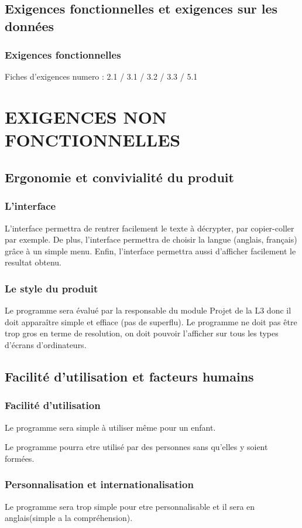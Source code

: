 \documentclass[a4]{article}
\begin{document}
		\subsection{Exigences fonctionnelles et exigences sur les données}
			\subsubsection {Exigences fonctionnelles}
				Fiches d'exigences numero : 2.1 / 3.1 / 3.2 / 3.3 / 5.1
	\section{EXIGENCES NON FONCTIONNELLES}
		\subsection{Ergonomie et convivialité du produit}
			\subsubsection {L'interface}
				L'interface permettra de rentrer facilement le texte à décrypter, par copier-coller par exemple.
				De plus, l'interface permettra de choisir la langue (anglais, français) grâce à un simple menu.
				Enfin, l'interface permettra aussi d'afficher facilement le resultat obtenu.
			\subsubsection {Le style du produit}
				Le programme sera évalué par la responsable du module Projet de la L3 donc il doit apparaître simple et effiace (pas de superflu).
				Le programme ne doit pas être trop gros en terme de resolution, on doit pouvoir l'afficher sur 	tous les types d'écrans d'ordinateurs.

		\subsection{Facilité d’utilisation et facteurs humains}
			\subsubsection {Facilité d'utilisation}
				Le programme sera simple à utiliser même pour un enfant.

				Le programme pourra etre utilisé par des personnes sans qu'elles y soient formées.
			\subsubsection {Personnalisation et internationalisation}
				Le programme sera trop simple pour etre personnalisable et il sera en anglais(simple a la compréhension).
\end{document}
